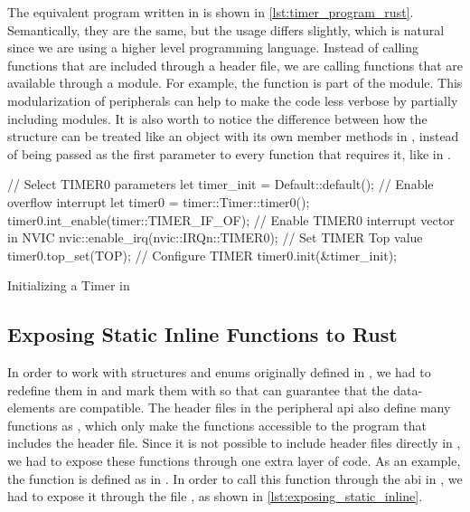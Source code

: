 The equivalent program written in {\rust} is shown in \autoref{lst:timer_program_rust}.
Semantically, they are the same, but the usage differs slightly, which is natural since we are using a higher level programming language.
Instead of calling functions that are included through a {\C} header file, we are calling functions that are available through a {\rust} module.
For example, the  function is part of the  module.
This modularization of peripherals can help to make the code less verbose by partially including modules.
It is also worth to notice the difference between how the  structure can be treated like an object with its own member methods in {\rust}, instead of being passed as the first parameter to every function that requires it, like in {\C}.

\begin{listing}[h]
\begin{rustcode}
// Select TIMER0 parameters
let timer_init = Default::default();
// Enable overflow interrupt
let timer0 = timer::Timer::timer0();
timer0.int_enable(timer::TIMER_IF_OF);
// Enable TIMER0 interrupt vector in NVIC
nvic::enable_irq(nvic::IRQn::TIMER0);
// Set TIMER Top value
timer0.top_set(TOP);
// Configure TIMER
timer0.init(&timer_init);
\end{rustcode}
\caption{Initializing a Timer in {\rust}}
\label{lst:timer_program_rust}
\end{listing}

\subsection{Exposing Static Inline Functions to Rust}
\label{ssec:exposing_static_inline_functions_to_rust}

In order to work with structures and enums originally defined in {\C}, we had to redefine them in {\rust} and mark them with \attrib{\#[repr(C)]} so that {\rust} can guarantee that the data-elements are {\C} compatible.
The header files in the peripheral \gls{api} also define many functions as , which only make the functions accessible to the program that includes the header file.
Since it is not possible to include {\C} header files directly in {\rust}, we had to expose these functions through one extra layer of {\C} code.
As an example, the  function is defined as  in .
In order to call this function through the {\C} \gls{abi} in {\rust}, we had to expose it through the file , as shown in \autoref{lst:exposing_static_inline}.

